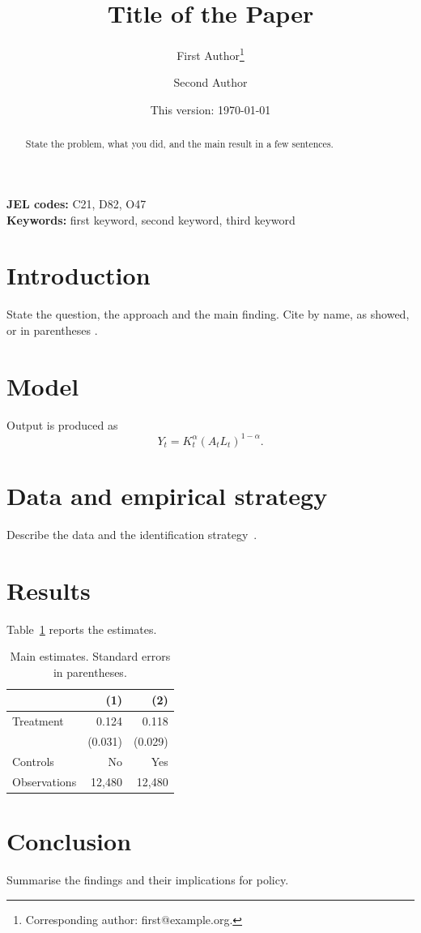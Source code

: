 \documentclass[12pt,a4paper]{article}
\title{Title of the Paper}
\author[1]{First Author\thanks{Corresponding author: first@example.org.}}
\author[2]{Second Author}
\affil[1]{Department of Economics, University, City, Country}
\affil[2]{Institute, City, Country}
\date{This version: \today}
\begin{document}
\maketitle

\begin{abstract}
State the problem, what you did, and the main result in a few sentences.
\end{abstract}

\noindent\textbf{JEL codes:} C21, D82, O47\\
\noindent\textbf{Keywords:} first keyword, second keyword, third keyword

\section{Introduction}
State the question, the approach and the main finding. Cite by name, as
\citet{akerlof1970} showed, or in parentheses \citep{solow1956}.

\section{Model}
Output is produced as
\begin{equation}
  Y_t = K_t^{\alpha} (A_t L_t)^{1-\alpha}.
  \label{eq:main}
\end{equation}

\section{Data and empirical strategy}
Describe the data and the identification strategy~\citep{angrist2009}.

\section{Results}
Table~\ref{tab:results} reports the estimates.

\begin{table}[htbp]
  \centering
  \caption{Main estimates. Standard errors in parentheses.}
  \label{tab:results}
  \begin{tabular}{lrr}
    \toprule
     & (1) & (2) \\
    \midrule
    Treatment & 0.124 & 0.118 \\
     & (0.031) & (0.029) \\
    Controls & No & Yes \\
    Observations & 12{,}480 & 12{,}480 \\
    \bottomrule
  \end{tabular}
\end{table}

\section{Conclusion}
Summarise the findings and their implications for policy.



\end{document}

